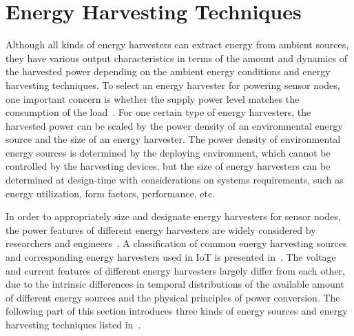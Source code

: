 \section{Energy Harvesting Techniques} \label{sec:eh}

Although all kinds of energy harvesters can extract energy from ambient sources, they have various output characteristics in terms of the amount and dynamics of the harvested power depending on the ambient energy conditions and energy harvesting techniques. 
To select an energy harvester for powering sensor nodes, one important concern is whether the supply power level matches the consumption of the load~\cite{shaikh2016energy}. 
For one certain type of energy harvesters, the harvested power can be scaled by the power density of an environmental energy source and the size of an energy harvester. 
The power density of environmental energy sources is determined by the deploying environment, which cannot be controlled by the harvesting devices, but the size of energy harvesters can be determined at design-time with considerations on systems requirements, such as energy utilization, form factors, performance, etc.  

In order to appropriately size and designate energy harvesters for sensor nodes, the power features of different energy harvesters are widely considered by researchers and engineers~\cite{moss2015scaling}. 
A classification of common energy harvesting sources and corresponding energy harvesters used in IoT is presented in~. 
The voltage and current features of different energy harvesters largely differ from each other, due to the intrinsic differences in temporal distributions of the available amount of different energy sources and the physical principles of power conversion. 
The following part of this section introduces three kinds of energy sources and energy harvesting techniques listed in~.

